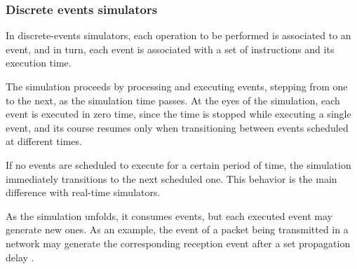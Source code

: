 \subsubsection{Discrete events simulators}
In discrete-events simulators, each operation to be performed is associated to an event, and in turn, each event is associated with a set of instructions and its execution time. 

The simulation proceeds by processing and executing events, stepping from one to the next, as the simulation time passes. At the eyes of the simulation, each event is executed in zero time, since the time is stopped while executing a single event, and its course resumes only when transitioning between events scheduled at different times.

If no events are scheduled to execute for a certain period of time, the simulation immediately transitions to the next scheduled one. This behavior is the main difference with real-time simulators.

As the simulation unfolds, it consumes events, but each executed event may generate new ones. As an example, the event of a packet being transmitted in a network may generate the corresponding reception event after a set propagation delay \cite{review-ns3}.


